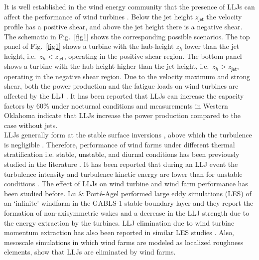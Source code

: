 \documentclass[%
 aip,
 amsmath,amssymb,
preprint,%
author-numerical,%
]{revtex4-1}
\begin{document}
\indent It is well established in the wind energy community that the presence of LLJs can affect the performance of wind turbines \cite{sis78}. Below the jet height $z_\mathsf{jet}$ the velocity profile has a positive shear, and above the jet height there is a negative shear. The schematic in Fig.\ \ref{fig1} shows the corresponding possible scenarios. The top panel of Fig.\ \ref{fig1} shows a turbine with the hub-height $z_h$ lower than the jet height, i.e.\ $z_h < z_\mathsf{jet}$, operating in the positive shear region. The bottom panel shows a turbine with the hub-height higher than the jet height, i.e.\ $z_h > z_\mathsf{jet}$, operating in the negative shear region. Due to the velocity maximum and strong shear, both the power production and the fatigue loads on wind turbines are affected by the LLJ \cite{gut17}. It has been reported that LLJs can increase the capacity factors by 60\% under nocturnal conditions \cite{wil15b} and measurements in Western Oklahoma\cite{gre09} indicate that LLJs increase the power production compared to the case without jets.\\
\indent LLJs generally form at the stable surface inversions \cite{baa09}, above which the turbulence is negligible \cite{bla57}. {\color{black} Therefore, performance of wind farms under different thermal stratification i.e. stable, unstable, and diurnal conditions has been previously studied in the literature \cite{dor15, abk16, ali18b, ali19, all18}.} {\color{black}It has been reported that during an LLJ event the turbulence intensity and turbulence kinetic energy are lower than for unstable conditions \cite{gut16}.} The effect of LLJs on wind turbine and wind farm performance has been studied before. Lu \& Port{\'e}-Agel \cite{lu11} performed large eddy simulations (LES) of an `infinite' windfarm in the GABLS-1 stable boundary layer and they report the formation of non-axisymmetric wakes and a decrease in the LLJ strength due to the energy extraction by the turbines. {\color{black}LLJ elimination due to wind turbine momentum extraction has also been reported in similar LES studies \cite{abk16, bha15, sha17d, ali17}.} Also, mesoscale simulations in which wind farms are modeled as localized roughness elements, show that LLJs are eliminated by wind farms\cite{fit13}.
\end{document}
